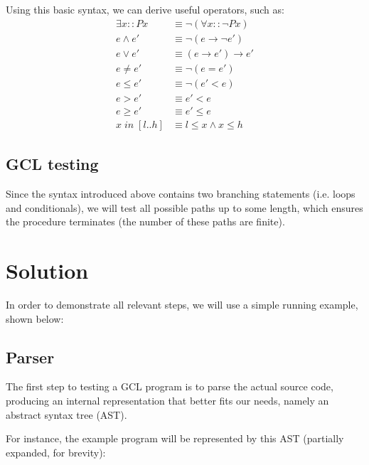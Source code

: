 \documentclass[nonatbib,numbers,10pt]{sigplanconf}
\begin{document}
Using this basic syntax, we can derive useful operators, such as:
\begin{align*}
\exists x :: P x &\equiv \neg (\forall x :: \neg P x) \\
e \land e' 	&\equiv \neg (e \rightarrow \neg e') \\
e \lor e'  	&\equiv (e \rightarrow e') \rightarrow e' \\
e \not= e' 	&\equiv \neg (e = e') \\
e \le e'   	&\equiv \neg (e' < e) \\
e > e'   	&\equiv e' < e \\
e \ge e'   	&\equiv e' \le e \\
x \; in \; [l..h] &\equiv l \le x \land x \le h 
\end{align*}

\subsection{GCL testing}
Since the syntax introduced above contains two branching statements (i.e. loops and conditionals), we will test all possible paths up to some length, which ensures the procedure terminates (the number of these paths are finite).

\section{Solution}
In order to demonstrate all relevant steps, we will use a simple running example, shown below:


\subsection{Parser}
The first step to testing a GCL program is to parse the actual source code, producing an internal representation that better fits our needs, namely an abstract syntax tree (AST).

For instance, the example program will be represented by this AST (partially expanded, for brevity):

\begin{figure}[h!]
\end{figure}
\end{document}
